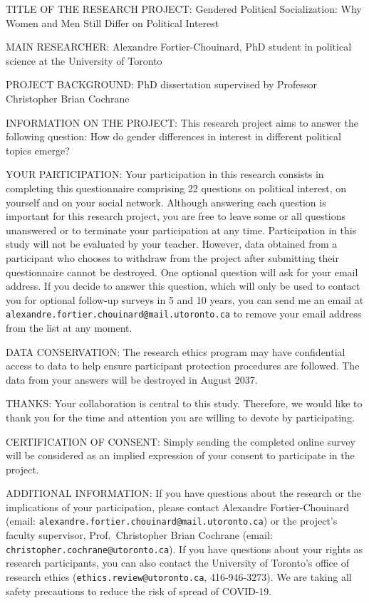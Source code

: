 \documentclass[
  letterpaper,
  DIV=11,
  numbers=noendperiod]{scrreprt}
\begin{document}
TITLE OF THE RESEARCH PROJECT: Gendered Political Socialization: Why
Women and Men Still Differ on Political Interest

MAIN RESEARCHER: Alexandre Fortier-Chouinard, PhD student in political
science at the University of Toronto

PROJECT BACKGROUND: PhD dissertation supervised by Professor Christopher
Brian Cochrane

INFORMATION ON THE PROJECT: This research project aims to answer the
following question: How do gender differences in interest in different
political topics emerge?

YOUR PARTICIPATION: Your participation in this research consists in
completing this questionnaire comprising 22 questions on political
interest, on yourself and on your social network. Although answering
each question is important for this research project, you are free to
leave some or all questions unanswered or to terminate your
participation at any time. Participation in this study will not be
evaluated by your teacher. However, data obtained from a participant who
chooses to withdraw from the project after submitting their
questionnaire cannot be destroyed. One optional question will ask for
your email address. If you decide to answer this question, which will
only be used to contact you for optional follow-up surveys in 5 and 10
years, you can send me an email at
\texttt{alexandre.fortier.chouinard@mail.utoronto.ca} to remove your
email address from the list at any moment.

DATA CONSERVATION: The research ethics program may have confidential
access to data to help ensure participant protection procedures are
followed. The data from your answers will be destroyed in August 2037.

THANKS: Your collaboration is central to this study. Therefore, we would
like to thank you for the time and attention you are willing to devote
by participating.

CERTIFICATION OF CONSENT: Simply sending the completed online survey
will be considered as an implied expression of your consent to
participate in the project.

ADDITIONAL INFORMATION: If you have questions about the research or the
implications of your participation, please contact Alexandre
Fortier-Chouinard (email:
\texttt{alexandre.fortier.chouinard@mail.utoronto.ca}) or the project's
faculty supervisor, Prof.~Christopher Brian Cochrane (email:
\texttt{christopher.cochrane@utoronto.ca}). If you have questions about
your rights as research participants, you can also contact the
University of Toronto's office of research ethics
(\texttt{ethics.review@utoronto.ca}, 416-946-3273). We are taking all
safety precautions to reduce the risk of spread of COVID-19.
\end{document}

